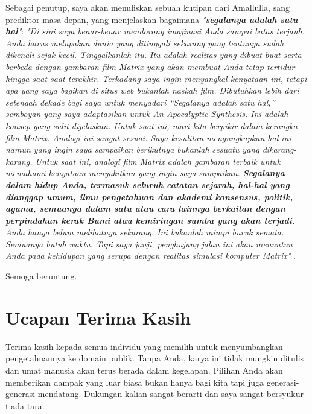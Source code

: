 \documentclass[10pt,twocolumn,letterpaper]{article}
\begin{document}
Sebagai penutup, saya akan menuliskan sebuah kutipan dari Amallulla, sang prediktor masa depan, yang menjelaskan bagaimana \textit{"\textbf{segalanya adalah satu hal}"}: \textit{"Di sini saya benar-benar mendorong imajinasi Anda sampai batas terjauh. Anda harus melupakan dunia yang ditinggali sekarang yang tentunya sudah dikenali sejak kecil. Tinggalkanlah itu. Itu adalah realitas yang dibuat-buat serta berbeda dengan gambaran film Matrix yang akan membuat Anda tetap tertidur hingga saat-saat terakhir. Terkadang saya ingin menyangkal kenyataan ini, tetapi apa yang saya bagikan di situs web bukanlah naskah film. Dibutuhkan lebih dari setengah dekade bagi saya untuk menyadari “Segalanya adalah satu hal,” semboyan yang saya adaptasikan untuk An Apocalyptic Synthesis. Ini adalah konsep yang sulit dijelaskan. Untuk saat ini, mari kita berpikir dalam kerangka film Matrix. Analogi ini sangat sesuai. Saya kesulitan mengungkapkan hal ini namun yang ingin saya sampaikan berikutnya bukanlah sesuatu yang dikarang-karang. Untuk saat ini, analogi film Matrix adalah gambaran terbaik untuk memahami kenyataan menyakitkan yang ingin saya sampaikan. \textbf{Segalanya dalam hidup Anda, termasuk seluruh catatan sejarah, hal-hal yang dianggap umum, ilmu pengetahuan dan akademi konsensus, politik, agama, semuanya dalam satu atau cara lainnya berkaitan dengan perpindahan kerak Bumi atau kemiringan sumbu yang akan terjadi.} Anda hanya belum melihatnya sekarang. Ini bukanlah mimpi buruk semata. Semuanya butuh waktu. Tapi saya janji, penghujung jalan ini akan menuntun Anda pada kehidupan yang serupa dengan realitas simulasi komputer Matrix"} \cite{33,34}.

Semoga beruntung.

\section{Ucapan Terima Kasih}

Terima kasih kepada semua individu yang memilih untuk menyumbangkan pengetahuannya ke domain publik. Tanpa Anda, karya ini tidak mungkin ditulis dan umat manusia akan terus berada dalam kegelapan. Pilihan Anda akan memberikan dampak yang luar biasa bukan hanya bagi kita tapi juga generasi-generasi mendatang. Dukungan kalian sangat berarti dan saya sangat bersyukur tiada tara.

\clearpage
\twocolumn

{\small


}
\end{document}
